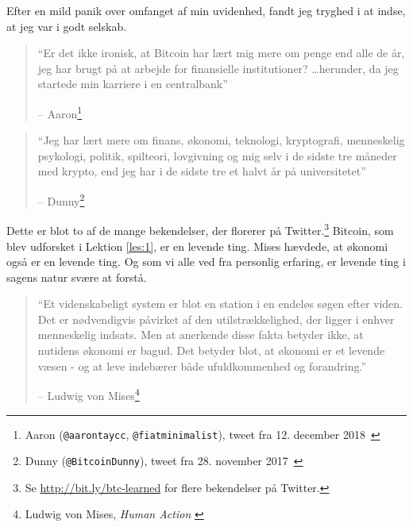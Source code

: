 \documentclass[paper=6in:9in,pagesize=pdftex,headinclude=on,footinclude=on,12pt]{scrbook}
\begin{document}
Efter en mild panik over omfanget af min uvidenhed, fandt jeg tryghed i at indse, at jeg var i godt selskab.\begin{quotation}\begin{samepage}
\enquote{Er det ikke ironisk, at Bitcoin har lært mig mere om penge end alle de år, jeg har brugt på at arbejde for finansielle institutioner? \ldots herunder, da jeg startede min karriere i en centralbank}
\begin{flushright} -- Aaron\footnote{Aaron (\texttt{@aarontaycc}, \texttt{@fiatminimalist}), tweet fra 12. december 2018~\cite{aarontaycc-tweet}}
\end{flushright}\end{samepage}\end{quotation}

\begin{quotation}\begin{samepage} \enquote{Jeg har lært mere om finans, økonomi, teknologi, kryptografi, menneskelig psykologi, politik, spilteori, lovgivning og mig selv i de sidste tre måneder med krypto, end jeg har i de sidste tre et halvt år på universitetet} \begin{flushright} -- Dunny\footnote{Dunny (\texttt{@BitcoinDunny}), tweet fra 28. november 2017~\cite{bitcoindunny-tweet}}
\end{flushright}\end{samepage}\end{quotation}

Dette er blot to af de mange bekendelser, der florerer på Twitter.\footnote{Se \url{http://bit.ly/btc-learned} for flere bekendelser på Twitter.} Bitcoin, som blev udforsket i Lektion  \ref{les:1}, er en levende ting. Mises hævdede, at økonomi også er en levende ting. Og som vi alle ved fra personlig erfaring, er levende ting i sagens natur svære at forstå.\begin{quotation}\begin{samepage} \enquote{Et videnskabeligt system er blot en station i en endeløs søgen efter viden. Det er nødvendigvis påvirket af den utilstrækkelighed, der ligger i enhver menneskelig indsats. Men at anerkende disse fakta betyder ikke, at nutidens økonomi er bagud. Det betyder blot, at økonomi er et levende væsen - og at leve indebærer både ufuldkommenhed og forandring.} \begin{flushright} -- Ludwig von Mises\footnote{Ludwig von Mises, \textit{Human Action} \cite{human-action}}
\end{flushright}\end{samepage}\end{quotation}
\end{document}
